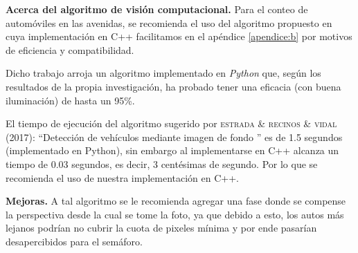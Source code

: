 \textbf{Acerca del algoritmo de visión computacional.}
Para el conteo de automóviles en las avenidas, se recomienda el uso del algoritmo propuesto en \cite{ittap} cuya implementación en C++ facilitamos en el apéndice \ref{apendice:b}  por motivos de eficiencia y compatibilidad. 

Dicho trabajo arroja un algoritmo implementado en \emph{Python} que, según los resultados de la propia investigación, ha probado tener una eficacia (con buena iluminación) de hasta un 95\%.

El tiempo de ejecución del algoritmo sugerido por \textsc{estrada \& recinos \& vidal (2017)}: ``Detección de vehículos mediante imagen de fondo '' es de 1.5 segundos (implementado en Python), sin embargo al implementarse en C++ alcanza un tiempo de 0.03 segundos, es decir, 3 centésimas de segundo. Por lo que se recomienda el uso de nuestra implementación en C++.

\textbf{Mejoras.}
A tal algoritmo se le recomienda agregar una fase donde se compense la perspectiva desde la cual se tome la foto, ya que debido a esto, los autos más lejanos podrían no cubrir la cuota de pixeles mínima y por ende pasarían desapercibidos para el semáforo.
